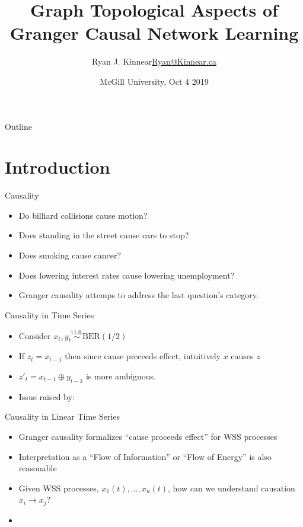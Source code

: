 \documentclass{beamer} %
\title{Graph Topological Aspects of Granger Causal Network Learning}
\author{\texorpdfstring{Ryan J. Kinnear\newline\url{Ryan@Kinnear.ca}}{Ryan J. Kinnear}}%
\institute[University of Waterloo] %
{
  University of Waterloo\\
  Department of Electrical and Computer Engineering
}
\date{McGill University, Oct 4 2019}
\begin{document}
\begin{frame}
  \titlepage
\end{frame}

\begin{frame}{Outline}
  \tableofcontents
\end{frame}

\section{Introduction}

\begin{frame}{Causality}
  \begin{itemize}
    \item{Do billiard collisions cause motion?}\pause
    \item{Does standing in the street cause cars to stop?}\pause
    \item{Does smoking cause cancer?}\pause
    \item{Does lowering interest rates cause lowering unemployment?}\pause
    \item{Granger causality attemps to address the last question's category.}
  \end{itemize}
\end{frame}

\begin{frame}{Causality in Time Series}
  \begin{itemize}
    \item{Consider $x_t, y_t \overset{\text{i.i.d.}}{\sim} \text{BER}(1/2)$}\pause
    \item{If $z_t = x_{t - 1}$ then since cause preceeds effect, intuitively $x$ causes $z$}\pause
    \item{$z'_t = x_{t - 1} \oplus y_{t - 1}$ is more ambiguous.}\pause
    \item{Issue raised by: } 
  \end{itemize}
\end{frame}

\begin{frame}{Causality in Linear Time Series}
  \begin{itemize}
    \item{Granger causality formalizes ``cause proceeds effect'' for WSS processes}\pause
    \item{Interpretation as a ``Flow of Information'' or ``Flow of Energy'' is also reasonable}\pause
    \item{Given WSS processes, $x_1(t), \ldots, x_n(t)$, how can we understand causation $x_i \rightarrow x_j$?}\pause
    \item{}
  \end{itemize}
\end{frame}
\end{document}
